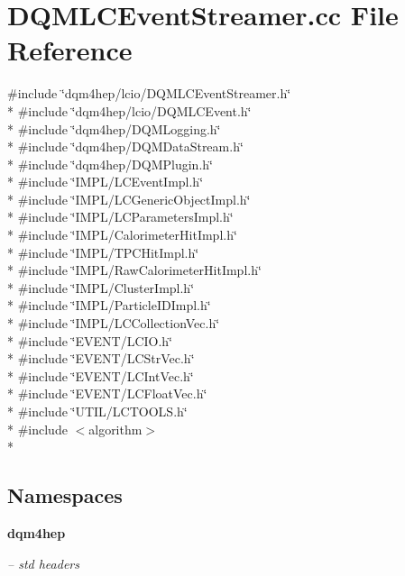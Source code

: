 \section{D\+Q\+M\+L\+C\+Event\+Streamer.\+cc File Reference}
\label{DQMLCEventStreamer_8cc}
{\ttfamily \#include \char`\"{}dqm4hep/lcio/\+D\+Q\+M\+L\+C\+Event\+Streamer.\+h\char`\"{}}\\*
{\ttfamily \#include \char`\"{}dqm4hep/lcio/\+D\+Q\+M\+L\+C\+Event.\+h\char`\"{}}\\*
{\ttfamily \#include \char`\"{}dqm4hep/\+D\+Q\+M\+Logging.\+h\char`\"{}}\\*
{\ttfamily \#include \char`\"{}dqm4hep/\+D\+Q\+M\+Data\+Stream.\+h\char`\"{}}\\*
{\ttfamily \#include \char`\"{}dqm4hep/\+D\+Q\+M\+Plugin.\+h\char`\"{}}\\*
{\ttfamily \#include \char`\"{}I\+M\+P\+L/\+L\+C\+Event\+Impl.\+h\char`\"{}}\\*
{\ttfamily \#include \char`\"{}I\+M\+P\+L/\+L\+C\+Generic\+Object\+Impl.\+h\char`\"{}}\\*
{\ttfamily \#include \char`\"{}I\+M\+P\+L/\+L\+C\+Parameters\+Impl.\+h\char`\"{}}\\*
{\ttfamily \#include \char`\"{}I\+M\+P\+L/\+Calorimeter\+Hit\+Impl.\+h\char`\"{}}\\*
{\ttfamily \#include \char`\"{}I\+M\+P\+L/\+T\+P\+C\+Hit\+Impl.\+h\char`\"{}}\\*
{\ttfamily \#include \char`\"{}I\+M\+P\+L/\+Raw\+Calorimeter\+Hit\+Impl.\+h\char`\"{}}\\*
{\ttfamily \#include \char`\"{}I\+M\+P\+L/\+Cluster\+Impl.\+h\char`\"{}}\\*
{\ttfamily \#include \char`\"{}I\+M\+P\+L/\+Particle\+I\+D\+Impl.\+h\char`\"{}}\\*
{\ttfamily \#include \char`\"{}I\+M\+P\+L/\+L\+C\+Collection\+Vec.\+h\char`\"{}}\\*
{\ttfamily \#include \char`\"{}E\+V\+E\+N\+T/\+L\+C\+I\+O.\+h\char`\"{}}\\*
{\ttfamily \#include \char`\"{}E\+V\+E\+N\+T/\+L\+C\+Str\+Vec.\+h\char`\"{}}\\*
{\ttfamily \#include \char`\"{}E\+V\+E\+N\+T/\+L\+C\+Int\+Vec.\+h\char`\"{}}\\*
{\ttfamily \#include \char`\"{}E\+V\+E\+N\+T/\+L\+C\+Float\+Vec.\+h\char`\"{}}\\*
{\ttfamily \#include \char`\"{}U\+T\+I\+L/\+L\+C\+T\+O\+O\+L\+S.\+h\char`\"{}}\\*
{\ttfamily \#include $<$algorithm$>$}\\*
\subsection*{Namespaces}
\begin{DoxyCompactItemize}
\item 
 {\bf dqm4hep}
\begin{DoxyCompactList}\small\item\em -- std headers \end{DoxyCompactList}\end{DoxyCompactItemize}
